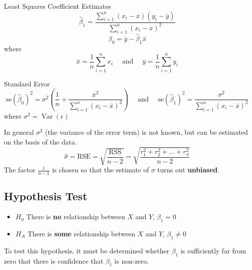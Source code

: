 \documentclass[11pt]{article}
\theoremstyle{definition}
\newcommand*\samplemean[1]{\overline{#1}}
\newcommand*\Var[1]{\mathop{\text{Var}}\left(#1\right)}
\begin{document}
\begin{definition}
	Least Squares Coefficient Estimates
	\begin{equation*}
		\hat{\beta}_1 = \frac{\sum_{i=1}^{n}(x_i - \samplemean{x})(y_i - \samplemean{y})}{\sum_{i=1}^{n}(x_i - \samplemean{x})^2}
	\end{equation*}
	\begin{equation*}
		\hat{\beta}_0 = \samplemean{y} - \hat{\beta}_1 \samplemean{x}
	\end{equation*}
	where
	\begin{equation*}
		\samplemean{x} = \frac{1}{n}\sum_{i=1}^{n} x_i\quad\text{ and }\quad\samplemean{y} = \frac{1}{n}\sum_{i=1}^{n} y_i	
	\end{equation*}
\end{definition}

\begin{definition}
	Standard Error
	\begin{equation*}
		\text{se}(\hat{\beta}_0)^2 = \sigma^2 \left( \frac{1}{n} + \frac{\samplemean{x}^2}{\sum_{i=1}^{n}(x_i - \samplemean{x})^2} \right) \quad\text{ and }\quad \text{se}(\hat{\beta}_1)^2 = \frac{\sigma^2}{\sum_{i=1}^{n}(x_i-\samplemean{x})^2}
	\end{equation*}
	where $\sigma^2 = \Var{\epsilon}$
\end{definition}
In general $\sigma^2$ (the variance of the error term) is not known, but can be estimated on the basis of the data.
\begin{equation*}
	\hat{\sigma} = \text{RSE} = \sqrt{\frac{\text{RSS}}{n-2}} = \sqrt{\frac{r_1^2 + r_2^2 + \dots + r_n^2}{n-2}}
\end{equation*}
The factor $\frac{1}{n-1}$ is chosen so that the estimate of $\sigma$ turns out \textbf{unbiased}.

\subsection{Hypothesis Test}
\begin{itemize}[noitemsep]
	\item $H_0$ There is \textbf{no} relationship between $X$ and $Y$, \quad $\beta_1 = 0$
	\item $H_A$ There is \textbf{some} relationship between $X$ and $Y$, \quad $\beta_1 \neq 0$
\end{itemize}
To test this hypothesis, it must be determined whether $\beta_1$ is sufficiently far from zero that there is confidence that $\beta_1$ is non-zero.
\end{document}
